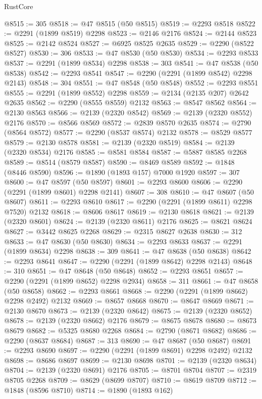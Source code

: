 \begin{lexlean}{RustCore}
\begin{coremodule}
@8515 := 305
@8518 := @47 @8515 (@50 @8515)
@8519 := @2293 @8518
@8522 := @2291 (@1899 @8519) @2298
@8523 := @2146 @2176
@8524 := @2144 @8523
@8525 := @2142 @8524
@8527 := @6925 @8525 @2635
@8529 := @2290 (@8522 @8527)
@8530 := 306
@8533 := @47 @8530 (@50 @8530)
@8534 := @2293 @8533
@8537 := @2291 (@1899 @8534) @2298
@8538 := 303
@8541 := @47 @8538 (@50 @8538)
@8542 := @2293 @8541
@8547 := @2290 (@2291 (@1899 @8542) @2298 @2143)
@8548 := 304
@8551 := @47 @8548 (@50 @8548)
@8552 := @2293 @8551
@8555 := @2291 (@1899 @8552) @2298
@8559 := @2134 (@2135 @207) @2642 @2635
@8562 := @2290 (@8555 @8559) @2132
@8563 := @8547 @8562
@8564 := @2130 @8563
@8566 := @2139 (@2320 @8542)
@8569 := @2139 (@2320 @8552) @2176
@8570 := @8566 @8569
@8572 := @2839 @8570 @2635
@8574 := @2790 (@8564 @8572)
@8577 := @2290 (@8537 @8574) @2132
@8578 := @8529 @8577
@8579 := @2130 @8578
@8581 := @2139 (@2320 @8519)
@8584 := @2139 (@2320 @8534) @2176
@8585 := @8581 @8584
@8587 := @5887 @8585 @2268
@8589 := @8514 (@8579 @8587)
@8590 := @8469 @8589
@8592 := @1848 (@8446 @8590)
@8596 := @1890 (@1893 @157) @7000 @1920
@8597 := 307
@8600 := @47 @8597 (@50 @8597)
@8601 := @2293 @8600
@8606 := @2290 (@2291 (@1899 @8601) @2298 @2141)
@8607 := 308
@8610 := @47 @8607 (@50 @8607)
@8611 := @2293 @8610
@8617 := @2290 (@2291 (@1899 @8611) @2298 @7520) @2132
@8618 := @8606 @8617
@8619 := @2130 @8618
@8621 := @2139 (@2320 @8601)
@8624 := @2139 (@2320 @8611) @2176
@8625 := @8621 @8624
@8627 := @3442 @8625 @2268
@8629 := @2315 @8627 @2638
@8630 := 312
@8633 := @47 @8630 (@50 @8630)
@8634 := @2293 @8633
@8637 := @2291 (@1899 @8634) @2298
@8638 := 309
@8641 := @47 @8638 (@50 @8638)
@8642 := @2293 @8641
@8647 := @2290 (@2291 (@1899 @8642) @2298 @2143)
@8648 := 310
@8651 := @47 @8648 (@50 @8648)
@8652 := @2293 @8651
@8657 := @2290 (@2291 (@1899 @8652) @2298 @2934)
@8658 := 311
@8661 := @47 @8658 (@50 @8658)
@8662 := @2293 @8661
@8668 := @2290 (@2291 (@1899 @8662) @2298 @2492) @2132
@8669 := @8657 @8668
@8670 := @8647 @8669
@8671 := @2130 @8670
@8673 := @2139 (@2320 @8642)
@8675 := @2139 (@2320 @8652)
@8678 := @2139 (@2320 @8662) @2176
@8679 := @8675 @8678
@8680 := @8673 @8679
@8682 := @5325 @8680 @2268
@8684 := @2790 (@8671 @8682)
@8686 := @2290 (@8637 @8684)
@8687 := 313
@8690 := @47 @8687 (@50 @8687)
@8691 := @2293 @8690
@8697 := @2290 (@2291 (@1899 @8691) @2298 @2492) @2132
@8698 := @8686 @8697
@8699 := @2130 @8698
@8701 := @2139 (@2320 @8634)
@8704 := @2139 (@2320 @8691) @2176
@8705 := @8701 @8704
@8707 := @2319 @8705 @2268
@8709 := @8629 (@8699 @8707)
@8710 := @8619 @8709
@8712 := @1848 (@8596 @8710)
@8714 := @1890 (@1893 @162)

\end{coremodule}
\end{lexlean}
